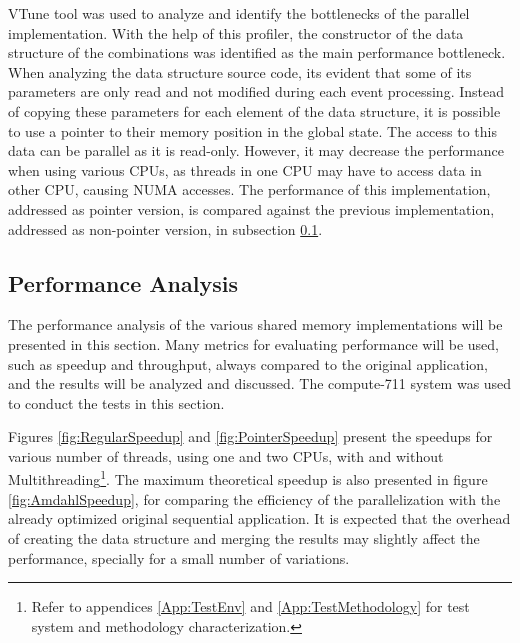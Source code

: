 \intel VTune tool was used to analyze and identify the bottlenecks of the parallel implementation. With the help of this profiler, the constructor of the data structure of the combinations was identified as the main performance bottleneck. When analyzing the data structure source code, its evident that some of its parameters are only read and not modified during each event processing. Instead of copying these parameters for each element of the data structure, it is possible to use a pointer to their memory position in the global state. The access to this data can be parallel as it is read-only. However, it may decrease the performance when using various CPUs, as threads in one CPU may have to access data in other CPU, causing NUMA accesses. The performance of this implementation, addressed as pointer version, is compared against the previous implementation, addressed as non-pointer version, in subsection \ref{SharedMemPerformance}.

\subsection{Performance Analysis}
\label{SharedMemPerformance}

The performance analysis of the various shared memory implementations will be presented in this section. Many metrics for evaluating performance will be used, such as speedup and throughput, always compared to the original application, and the results will be analyzed and discussed. The compute-711 system was used to conduct the tests in this section.

Figures \ref{fig:RegularSpeedup} and \ref{fig:PointerSpeedup} present the speedups for various number of threads, using one and two CPUs, with and without Multithreading\footnote{Refer to appendices \ref{App:TestEnv} and \ref{App:TestMethodology} for test system and methodology characterization.}. The maximum theoretical speedup is also presented in figure \ref{fig:AmdahlSpeedup}, for comparing the efficiency of the parallelization with the already optimized original sequential application. It is expected that the overhead of creating the data structure and merging the results may slightly affect the performance, specially for a small number of variations.

